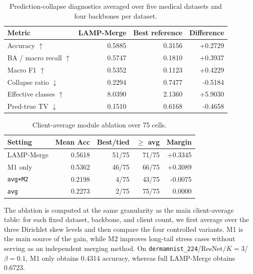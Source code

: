 \begin{table}[t]
\centering
\caption{Prediction-collapse diagnostics averaged over five medical datasets and four backbones per dataset.}
\label{tab:collapse-key}
\scriptsize
\setlength{\tabcolsep}{3.2pt}
\begin{tabular}{lrrr}
\toprule
Metric & LAMP-Merge & Best reference & Difference \\
\midrule
Accuracy $\uparrow$ & 0.5885 & 0.3156 & +0.2729 \\
BA / macro recall $\uparrow$ & 0.5747 & 0.1810 & +0.3937 \\
Macro F1 $\uparrow$ & 0.5352 & 0.1123 & +0.4229 \\
Collapse ratio $\downarrow$ & 0.2294 & 0.7477 & -0.5184 \\
Effective classes $\uparrow$ & 8.0390 & 2.1360 & +5.9030 \\
Pred-true TV $\downarrow$ & 0.1510 & 0.6168 & -0.4658 \\
\bottomrule
\end{tabular}
\end{table}

\begin{table}[t]
\centering
\caption{Client-average module ablation over 75 cells.}
\label{tab:module-ablation}
\scriptsize
\setlength{\tabcolsep}{3.2pt}
\begin{tabular}{lrrrr}
\toprule
Setting & Mean Acc & Best/tied & $\ge$ avg & Margin \\
\midrule
LAMP-Merge & 0.5618 & 51/75 & 71/75 & +0.3345 \\
M1 only & 0.5362 & 46/75 & 66/75 & +0.3089 \\
\texttt{avg+M2} & 0.2198 & 4/75 & 43/75 & -0.0075 \\
\texttt{avg} & 0.2273 & 2/75 & 75/75 & 0.0000 \\
\bottomrule
\end{tabular}
\end{table}

The ablation is computed at the same granularity as the main client-average table: for each fixed dataset, backbone, and client count, we first average over the three Dirichlet skew levels and then compare the four controlled variants. M1 is the main source of the gain, while M2 improves long-tail stress cases without serving as an independent merging method. On \texttt{dermamnist\_224}/ResNet/$K=3$/$\beta=0.1$, M1 only obtains 0.4314 accuracy, whereas full LAMP-Merge obtains 0.6723.

